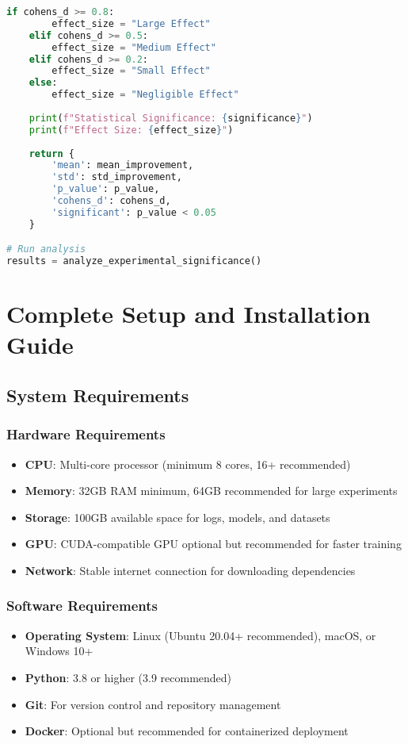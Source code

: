 \documentclass[12pt,a4paper]{article}
\begin{document}
\begin{lstlisting}[language=Python, caption=Statistical Analysis of Results]
    if cohens_d >= 0.8:
        effect_size = "Large Effect"
    elif cohens_d >= 0.5:
        effect_size = "Medium Effect"
    elif cohens_d >= 0.2:
        effect_size = "Small Effect"
    else:
        effect_size = "Negligible Effect"
    
    print(f"Statistical Significance: {significance}")
    print(f"Effect Size: {effect_size}")
    
    return {
        'mean': mean_improvement,
        'std': std_improvement,
        'p_value': p_value,
        'cohens_d': cohens_d,
        'significant': p_value < 0.05
    }

# Run analysis
results = analyze_experimental_significance()
\end{lstlisting}

\section{Complete Setup and Installation Guide}

\subsection{System Requirements}

\subsubsection{Hardware Requirements}
\begin{itemize}
    \item \textbf{CPU}: Multi-core processor (minimum 8 cores, 16+ recommended)
    \item \textbf{Memory}: 32GB RAM minimum, 64GB recommended for large experiments
    \item \textbf{Storage}: 100GB available space for logs, models, and datasets
    \item \textbf{GPU}: CUDA-compatible GPU optional but recommended for faster training
    \item \textbf{Network}: Stable internet connection for downloading dependencies
\end{itemize}

\subsubsection{Software Requirements}
\begin{itemize}
    \item \textbf{Operating System}: Linux (Ubuntu 20.04+ recommended), macOS, or Windows 10+
    \item \textbf{Python}: 3.8 or higher (3.9 recommended)
    \item \textbf{Git}: For version control and repository management
    \item \textbf{Docker}: Optional but recommended for containerized deployment
\end{itemize}
\end{document}
